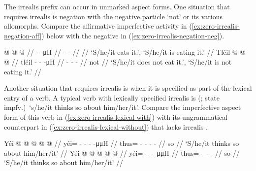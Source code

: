 \begin{multicols}{2}
\noindent
The irrealis prefix  can occur in unmarked aspect forms.
One situation that requires irrealis  is negation with the negative particle  ‘not’ or its various allomorphs.
Compare the affirmative imperfective activity in (\ref{ex:zero-irrealis-negation-aff}) below with the negative in (\ref{ex:zero-irrealis-negation-neg}).

\pex\label{ex:zero-irrealis-negation}%
\a\label{ex:zero-irrealis-negation-aff}%
%
\begingl
	\gla	{} @ {} @ {} @ {} //
	\glb	{}-  -μH //
	\glc	{}-  - //
	\gld	{} {} {} {} //
	\glft	‘S/he/it eats it.’, ‘S/he/it is eating it.’
		//
\endgl
\a\label{ex:zero-irrealis-negation-neg}%
%
\begingl
	\gla	Tléil  @ {} @ {} @ {} //
	\glb	tléil - -  -μH //
	\glc	{} - -  - //
	\gld	not  {} {} {} //
	\glft	‘S/he/it does not eat it.’, ‘S/he/it is not eating it.’
		//
\endgl
\xe

Another situation that requires irrealis  is when it is specified as part of the lexical entry of a verb.
A typical verb with lexically specified irrealis is  (;  state impfv.)\ ‘s/he/it thinks so about him/her/it’.
Compare the imperfective aspect form of this verb in (\ref{ex:zero-irrealis-lexical-with}) with its ungrammatical counterpart in (\ref{ex:zero-irrealis-lexical-without}) that lacks irrealis .

\pex\label{ex:zero-irrealis-lexical}%
\a\label{ex:zero-irrealis-lexical-with}%
%
\begingl
	\gla	Yéi @  @ {} @ {} @ {} @ {} //
	\glb	yéi= - - -  -μμH //
	\glc	thus= - - -  - //
	\gld	so  {} {} {} {} //
	\glft	‘S/he/it thinks so about him/her/it’
		//
\endgl
\a\label{ex:zero-irrealis-lexical-without}%
\ljudge{*}%
%
\begingl
	\gla	Yéi @  @ {} @ {} @ {} @ {} //
	\glb	yéi= -  -  -μμH //
	\glc	thus= -  -  - //
	\gld	so  {} {} {} {} //
	\glft	‘S/he/it thinks so about him/her/it’
		//
\endgl
\xe


\end{multicols}
